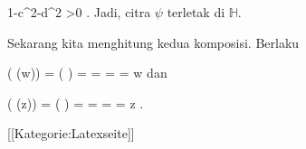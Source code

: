 \mavergleichskettedisp
{\vergleichskette
{ 1-c^2-d^2
}
{ >0} {
}
{ } {
}
{ } {
}
{ } {
}
}
{}{}{.}
Jadi, citra $\psi$ terletak di ${\mathbb H}$.

Sekarang kita menghitung kedua komposisi. Berlaku

\mavergleichskettealign
{\vergleichskettealign
{ \varphi( \psi(w))
}
{ =} { \varphi \left(  \right)
}
{ =} { {  }
}
{ =} { {  }
}
{ =} { {  }
}
}
{
\vergleichskettefortsetzungalign
{ =} { w
}
{ } {}
{ } {}
{ } {}
}
{}{}
dan

\mavergleichskettealign
{\vergleichskettealign
{ \psi( \varphi(z))
}
{ =} { \psi \left(  {  }  \right)
}
{ =} { {  }
}
{ =} { {  }
}
{ =} { {  }
}
}
{
\vergleichskettefortsetzungalign
{ =} { z
}
{ } {}
{ } {}
{ } {}
}
{}{.}

 [[Kategorie:Latexseite]]
